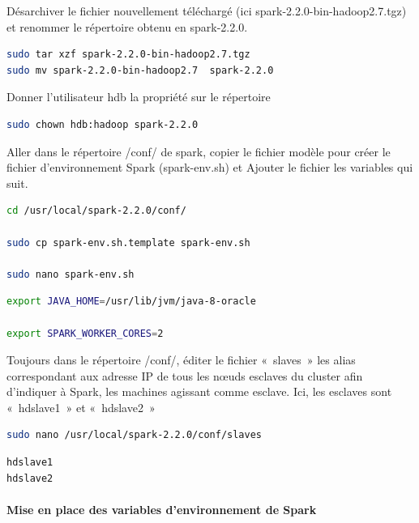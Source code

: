 \documentclass[12pt,english]{book}
\begin{document}
Désarchiver le fichier nouvellement téléchargé (ici spark-2.2.0-bin-hadoop2.7.tgz) et renommer le répertoire obtenu en spark-2.2.0.

\begin{lstlisting}[language=bash, frame=single, basicstyle=\footnotesize]
sudo tar xzf spark-2.2.0-bin-hadoop2.7.tgz 
sudo mv spark-2.2.0-bin-hadoop2.7  spark-2.2.0
\end{lstlisting}

Donner l’utilisateur hdb la propriété sur le répertoire

\begin{lstlisting}[language=bash, frame=single, basicstyle=\footnotesize]
sudo chown hdb:hadoop spark-2.2.0
\end{lstlisting}

Aller dans le répertoire /conf/ de spark, copier le fichier modèle pour créer le fichier d’environnement Spark (spark-env.sh) et Ajouter le fichier les variables qui suit.

\begin{lstlisting}[language=bash, frame=single, basicstyle=\footnotesize]
cd /usr/local/spark-2.2.0/conf/

sudo cp spark-env.sh.template spark-env.sh

sudo nano spark-env.sh
\end{lstlisting}

\begin{lstlisting}[language=bash, frame=single, basicstyle=\footnotesize]
export JAVA_HOME=/usr/lib/jvm/java-8-oracle

export SPARK_WORKER_CORES=2
\end{lstlisting}

Toujours dans le répertoire /conf/, éditer le fichier « slaves » les alias correspondant aux adresse IP de tous les nœuds esclaves du cluster afin d’indiquer à Spark, les machines agissant comme esclave.
Ici, les esclaves sont « hdslave1 » et « hdslave2 »

\begin{lstlisting}[language=bash, frame=single, basicstyle=\footnotesize]
sudo nano /usr/local/spark-2.2.0/conf/slaves
\end{lstlisting}

\begin{lstlisting}[language=bash, frame=single, basicstyle=\footnotesize]
hdslave1
hdslave2
\end{lstlisting}

\paragraph{Mise en place des variables d’environnement de Spark}\mbox{}\\
\end{document}
